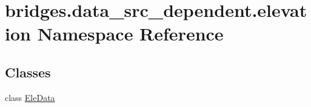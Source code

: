 \hypertarget{namespacebridges_1_1data__src__dependent_1_1elevation}{}\section{bridges.\+data\+\_\+src\+\_\+dependent.\+elevation Namespace Reference}
\label{namespacebridges_1_1data__src__dependent_1_1elevation}
\subsection*{Classes}
\begin{DoxyCompactItemize}
\item 
class \mbox{\hyperlink{classbridges_1_1data__src__dependent_1_1elevation_1_1_ele_data}{Ele\+Data}}
\end{DoxyCompactItemize}
